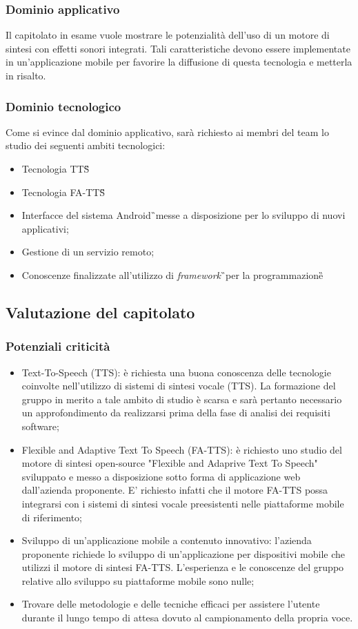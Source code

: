 \subsubsection{Dominio applicativo}
Il capitolato in esame vuole mostrare le potenzialità dell'uso di un motore di sintesi con effetti sonori integrati. Tali caratteristiche devono essere implementate in un'applicazione mobile per favorire la diffusione di questa tecnologia e metterla in risalto.

\subsubsection{Dominio tecnologico}
Come si evince dal dominio applicativo, sarà richiesto ai membri del team lo studio dei seguenti ambiti tecnologici:
\begin{itemize}
\item Tecnologia TTS\G\;
\item Tecnologia FA-TTS\G\;
\item Interfacce del sistema Android\G\ messe a disposizione per lo sviluppo di nuovi applicativi;
\item Gestione di un servizio remoto;
\item Conoscenze finalizzate all'utilizzo di \textit{framework}\G\ per la programmazione\G\;
\end{itemize}

\subsection{Valutazione del capitolato}
\subsubsection{Potenziali criticità}
\begin{itemize}
\item Text-To-Speech (TTS): è richiesta una buona conoscenza delle tecnologie coinvolte nell'utilizzo di sistemi di sintesi vocale (TTS). La formazione del gruppo in merito a tale ambito di studio è scarsa e sarà pertanto necessario un approfondimento da realizzarsi prima della fase di analisi dei requisiti software;
\item Flexible and Adaptive Text To Speech (FA-TTS): è richiesto uno studio del motore di sintesi open-source "Flexible and Adaprive Text To Speech" sviluppato e messo a disposizione  sotto forma di applicazione web dall'azienda proponente. E' richiesto infatti che il motore FA-TTS possa integrarsi con i sistemi di sintesi vocale preesistenti nelle piattaforme mobile di riferimento;
\item Sviluppo di un'applicazione mobile a contenuto innovativo: l'azienda proponente richiede lo sviluppo di un'applicazione per dispositivi mobile che utilizzi il motore di sintesi FA-TTS. L'esperienza e le conoscenze del gruppo relative allo sviluppo su piattaforme mobile sono nulle;
\item Trovare delle metodologie e delle tecniche efficaci per assistere l'utente durante il lungo tempo di attesa dovuto al campionamento della propria voce.
\end{itemize}

